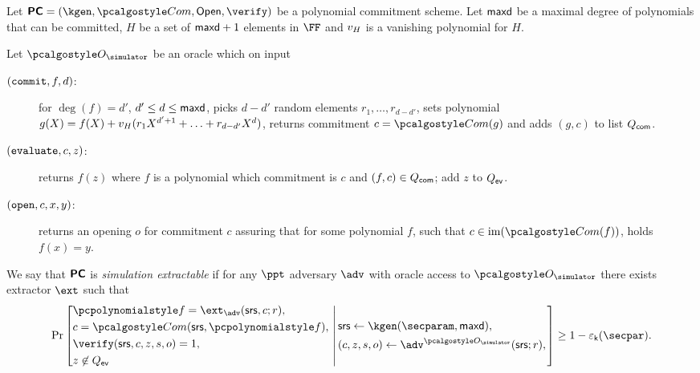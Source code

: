 \documentclass[runningheads,11pt]{llncs}
\begin{document}
\begin{definition}
  \label{def:sepcom}
  Let $\PCOM = (\kgen, \com, \open, \verify)$ be a polynomial commitment
  scheme. Let $\mathsf{maxd}$ be a maximal degree of polynomials that can be
  committed, $H$ be a set of $\mathsf{maxd} + 1$ elements in $\FF$ and
  $v_{H}$ is a vanishing polynomial for $H$.
  
  Let $\oracles$ be an oracle which on input
  \begin{description}
\item[$(\mathtt{commit}, f, d)$:] for $\deg(f) = d'$, $d' \leq d \leq \mathsf{maxd}$,
  picks $d - d'$ random elements $r_1, \ldots, r_{d - d'}$, sets 
  polynomial $g(X) = f(X) + v_{H}(r_1 X^{d' + 1} + \ldots + r_{d - d'} X^{d})$, returns
  commitment $c = \com(g)$ and adds $(g, c)$ to list $Q_{\mathsf{com}}$.
  \item[$(\mathtt{evaluate}, c, z)$:] returns $f(z)$ where $f$ is a polynomial
    which commitment is $c$ and $(f, c) \in Q_{\mathsf{com}}$; add $z$ to $Q_{\mathsf{ev}}$.
  \item[$(\mathtt{open}, c, x, y)$:] returns an opening $o$ for commitment $c$
    assuring that for some polynomial $f$, such that $c \in \image(\com(f))$,
    holds $f(x) = y$.
  \end{description}
  We say that $\bm{\mathsf{PC}}$ is \emph{simulation extractable} if for any $\ppt$
  adversary $\adv$ with oracle access to $\oracles$ there exists extractor
  $\ext$ such that
\[
  \Pr \left[
    \begin{aligned}
      & \p{f} = \ext_\adv(\srs, c; r),\\
      & c = \com(\srs, \p{f}),\\
      & \verify(\srs, c, z, s, o) = 1,\\
      & z \not\in \Qev
    \end{aligned}
    \,\left|\,
      \vphantom{
        \begin{aligned}
          & \\
          & \\
          & \\
          &
        \end{aligned}
        }
    \begin{aligned}
      & \srs \gets \kgen(\secparam, \maxdeg),\\
      & (c, z, s, o) \gets \adv^{\oracles}(\srs; r), \\
    \end{aligned}
  \right.\right]
  \geq 1 - \epsk(\secpar).
\]
\end{definition}
\end{document}
